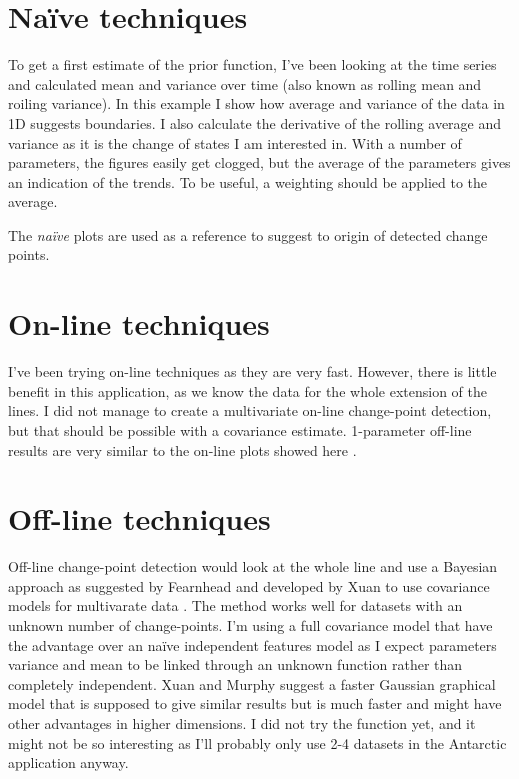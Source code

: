 \section{Naïve techniques}
To get a first estimate of the prior function, I've been looking at the time series and calculated mean and variance over time (also known as rolling mean and roiling variance). In this example I show how average and variance of the data in 1D suggests boundaries. I also calculate the derivative of the rolling average and variance as it is the change of states I am interested in. With a number of parameters, the figures easily get clogged, but the average of the parameters gives an indication of the trends. To be useful, a weighting should be applied to the average. 

The \textit{naïve} plots are used as a reference to suggest to origin of detected change points. 

\section{On-line techniques}
I've been trying on-line techniques as they are very fast. However, there is little benefit in this application, as we know the data for the whole extension of the lines. I did not manage to create a multivariate on-line change-point detection, but that should be possible with a covariance estimate. 1-parameter off-line results are very similar to the on-line plots showed here \cite{Adams2007}. 



\section{Off-line techniques}
Off-line change-point detection would look at the whole line and use a Bayesian approach as suggested by Fearnhead \cite{Fearnhead2006} and developed by Xuan to use covariance models for multivarate data \cite{Xuan2007}. The method works well for datasets with an unknown number of change-points.
I'm using a full covariance model that have the advantage over an naïve independent features model as I expect parameters variance and mean to be linked through an unknown function rather than completely independent. Xuan and Murphy suggest a faster Gaussian graphical model that is supposed to give similar results but is much faster and might have other advantages in higher dimensions. I did not try the function yet, and it might not  be so interesting as I'll probably only use 2-4 datasets in the Antarctic application anyway. 



